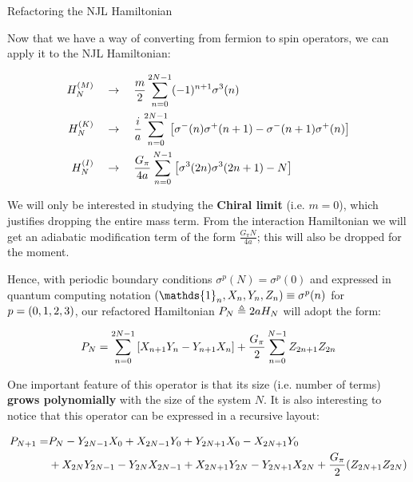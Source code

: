 \documentclass[9pt, handout, aspectratio=169]{beamer}	%
\begin{document}

\begin{frame}[allowframebreaks]{Refactoring the NJL Hamiltonian}

	Now that we have a way of converting from fermion to spin operators, we can apply it to the NJL Hamiltonian:

	\begin{align*}
	  H_{N}^{(M)} &\quad \rightarrow \quad
	    \frac{m}{2} \sum_{n=0}^{2N-1} (-1)^{n+1}\sigma^{3}(n) \\
	  H_{N}^{(K)} &\quad \rightarrow \quad
	    \frac{i}{a} \sum_{n=0}^{2N-1}
	    \qty[\sigma^{-}(n)\sigma^{+}(n+1) - \sigma^{-}(n+1)\sigma^{+}(n)] \\
	  H_{N}^{(I)} &\quad \rightarrow \quad
	    \frac{G_{\pi}}{4a} \sum_{n=0}^{N-1} \qty[\sigma^{3}(2n)\sigma^{3}(2n+1) - N]
	\end{align*}

	We will only be interested in studying the \textbf{Chiral limit} (i.e. $m=0$), which justifies dropping the entire mass term. From the interaction Hamiltonian we will get an adiabatic modification term of the form $\frac{G_{\pi}N}{4a}$; this will also be dropped for the moment.

\break

	Hence, with periodic boundary conditions $\sigma^{p}(N)=\sigma^{p}(0)$ and expressed in quantum computing notation $\qty(\mathds{1}_{n},X_{n},Y_{n},Z_{n}) \equiv \sigma^{p}(n)$ for $p=\qty(0,1,2,3)$, our refactored Hamiltonian $P_{N} \triangleq 2aH_{N}$ will adopt the form:

	\begin{gather} \label{eq:NJL1-refactored-hamiltonian}
	  P_{N} =
	    \sum_{n=0}^{2N-1} \qty[X_{n+1} Y_{n} - Y_{n+1} X_{n}] +
	      \frac{G_{\pi}}{2} \sum_{n=0}^{N-1} Z_{2n+1} Z_{2n}
	\end{gather}

	One important feature of this operator is that its size (i.e. number of terms) \textbf{grows polynomially} with the size of the system $N$. It is also interesting to notice that this operator can be expressed in a recursive layout:

	\begin{align*}
		P_{N+1} =& P_{N}
				- Y_{2N-1} X_{0} + X_{2N-1} Y_{0} + Y_{2N+1} X_{0} - X_{2N+1} Y_{0} \\
			&+ X_{2N} Y_{2N-1} - Y_{2N} X_{2N-1} + X_{2N+1} Y_{2N} - Y_{2N+1} X_{2N}
				+ \frac{G_{\pi}}{2} \qty(Z_{2N+1} Z_{2N})
	\end{align*}

\end{frame}
\end{document}
